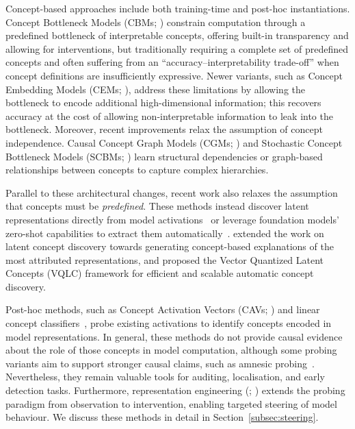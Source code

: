 Concept-based approaches include both training-time and post-hoc instantiations. Concept Bottleneck Models (CBMs; ) constrain computation through a predefined bottleneck of interpretable concepts, offering built-in transparency and allowing for interventions, but traditionally requiring a complete set of predefined concepts and often suffering from an ``accuracy--interpretability trade-off'' when concept definitions are insufficiently expressive. Newer variants, such as Concept Embedding Models (CEMs; ), address these limitations by allowing the bottleneck to encode additional high-dimensional information; this recovers accuracy at the cost of allowing non-interpretable information to leak into the bottleneck. Moreover, recent improvements relax the assumption of concept independence. Causal Concept Graph Models (CGMs; ) and Stochastic Concept Bottleneck Models (SCBMs; ) learn structural dependencies or graph-based relationships between concepts to capture complex hierarchies.

Parallel to these architectural changes, recent work also relaxes the assumption that concepts must be \textit{predefined}. These methods instead discover latent representations directly from model activations~ or leverage foundation models' zero-shot capabilities to extract them automatically~.  extended the work on latent concept discovery towards generating concept-based explanations of the most attributed representations, and  proposed the Vector Quantized Latent Concepts (VQLC) framework for efficient and scalable automatic concept discovery.

Post-hoc methods, such as Concept Activation Vectors (CAVs; ) and linear concept classifiers~, probe existing activations to identify concepts encoded in model representations. In general, these methods do not provide causal evidence about the role of those concepts in model computation, although some probing variants aim to support stronger causal claims, such as amnesic probing~. Nevertheless, they remain valuable tools for auditing, localisation, and early detection tasks. Furthermore, representation engineering (; ) extends the probing paradigm from observation to intervention, enabling targeted steering of model behaviour. We discuss these methods in detail in Section~\ref{subsec:steering}.


